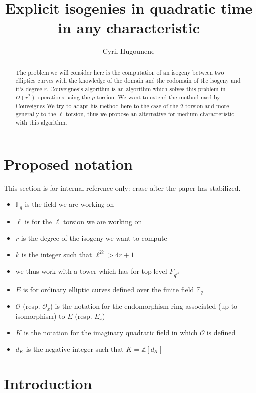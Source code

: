 \documentclass{article}
\title{Explicit isogenies in quadratic time in any characteristic}
\author{Cyril Hugounenq}
\theoremstyle{plain}
\theoremstyle{definition}
\theoremstyle{remark}
\begin{document}
\maketitle

\begin{abstract}
The problem we will consider here is the computation of an isogeny between two elliptics curves with the knowledge of the domain and the codomain of the isogeny and it's degree $r$. Couveignes's algorithm is an algorithm which solves this problem in $O(r^2)$ operations using the $p$-torsion. We want to extend the method used by Couveignes  We try to adapt his method here to the case of the $2$ torsion and more generally to the $\ell$ torsion, thus we propose an alternative for medium characteristic with this algorithm.
\end{abstract}

\section*{Proposed notation}

This section is for internal reference only: erase after the paper has
stabilized.

\begin{itemize}
\item $\mathbb{F}_q$ is the field we are working on
\item $\ell$ is for the $\ell$ torsion we are working on
\item $r$ is the degree of the isogeny we want to compute
\item $k$ is the integer such that $\ell^{2k}>4r+1$
\item we thus work with a tower which has for top level $F_{q^{\ell^k}}$
\item $E$ is for ordinary elliptic curves defined over the finite field $\mathbb{F}_q$
\item $\mathcal{O}$ (resp. $\mathcal{O}_x$) is the notation for the endomorphism ring associated (up to isomorphism) to $E$ (resp. $E_x$)
\item $K$ is the notation for the imaginary quadratic field in which $\mathcal{O}$ is defined
\item $d_K$ is the negative integer such that $K=\mathbb{Z}[d_K]$  
\end{itemize}


\section{Introduction}
\label{sec:introduction}
\end{document}
